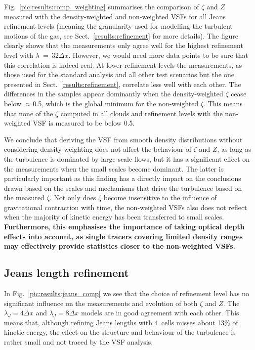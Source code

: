 Fig.~\ref{pic:results:comp_weighting} summarises the comparison of $\zeta$ and $Z$ measured with the density-weighted and non-weighted VSFs for all Jeans refinement levels (meaning the granularity used for modelling the turbulent motions of the gas, see Sect.~\ref{results:refinement} for more details).
The figure clearly shows that the measurements only agree well for the highest refinement level with $\lambda~=~32\Delta x$.
However, we would need more data points to be sure that this correlation is indeed real.
At lower refinement levels the measurements, as those used for the standard analysis and all other test scenarios but the one presented in Sect.~\ref{results:refinement}, correlate less well with each other. 
The differences in the samples appear dominantly when the density-weighted $\zeta$ cease below $\approx$0.5, which is the global minimum for the non-weighted $\zeta$. 
This means that none of the $\zeta$ computed in all clouds and refinement levels with the non-weighted VSF is measured to be below 0.5.

We conclude that deriving the VSF from smooth density distributions without considering density-weighting does not affect the behaviour of $\zeta$ and $Z$, as long as the turbulence is dominated by large scale flows, but it has a significant effect on the measurements when the small scales become dominant.
The latter is particularly important as this finding has a directly impact on the conclusions drawn based on the scales and mechanisms that drive the turbulence based on the measured $\zeta$.
Not only does $\zeta$ become insensitive to the influence of gravitational contraction with time, the non-weighted VSFs also does not reflect when the majority of kinetic energy has been transferred to small scales. 
\textbf{Furthermore, this emphasises the importance of taking optical depth effects into account, as single tracers covering limited density ranges may effectively provide statistics closer to the non-weighted VSFs.}

\subsection{Jeans length refinement}\label{discussion:refinement}

In Fig.~\ref{pic:results:jeans_comp} we see that the choice of refinement level has no significant influence on the measurements and evolution of both $\zeta$ and $Z$. 
The $\lambda_J=4\Delta{}x$ and $\lambda_J=8\Delta{}x$ models are in good agreement with each other.
This means that, although refining Jeans lengths with 4~cells misses about 13\% of kinetic energy, the effect on the structure and behaviour of the turbulence is rather small and not traced by the VSF analysis.

